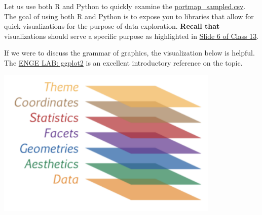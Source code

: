 \documentclass[letterpaper,addpoints, 11pt]{exam}
\begin{document}
\begin{questions}
\question[0] Let us use both R and Python to quickly examine the \href{https://miamioh.instructure.com/courses/179812/files/25728247?module_item_id=4056689}{portmap\_sampled.csv}. The goal of using both R and Python is to expose you to libraries that allow for quick visualizations for the purpose of data exploration. \textbf{Recall that} visualizations should serve a specific purpose as highlighted in \href{https://fmegahed.github.io/isa401/fall2022/class13/13_fundamentals_data_viz.html?panelset4=activity5&panelset5=activity6&panelset6=activity7&panelset7=activity8#6}{Slide 6 of Class 13}.

\vspace{2in}

\question[0] If we were to discuss the grammar of graphics, the visualization below is helpful. The \href{https://englelab.gatech.edu/useRguide/introduction-to-ggplot2.html}{ENGE LAB: ggplot2} is an excellent introductory reference on the topic.

\begin{center}
	\includegraphics[width=0.8\textwidth,frame]{../../figures/gg_layers_from_gatech_englelab.png}
\end{center}

\end{questions}
\end{document}
